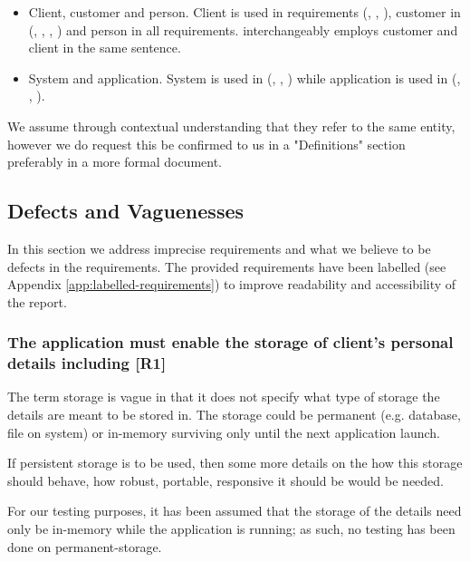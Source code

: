 \begin{itemize} 
	\item Client, customer and person. Client is used in requirements (\ROne, \RTwo, \RFive), customer in (\RTwo, \RThree, \RFour, \RFive) and person in all \REight \space requirements. \RFive \space interchangeably employs customer and client in the same sentence. 
	\item System and application. System is used in (\RTwo, \RSix, \RSeven) while application is used in (\ROne, \RFour, \RFive).
\end{itemize}

We assume through contextual understanding that they refer to the same entity, however we do request this be confirmed to us in a "Definitions" section preferably in a more formal document.
\par


\subsection{Defects and Vaguenesses}

In this section we address imprecise requirements and what we believe to be defects in the requirements. The provided requirements have been labelled (see Appendix \ref{app:labelled-requirements}) to improve readability and accessibility of the report. 

\subsubsection{The application must enable the storage of client’s personal details including [R1]}
The term storage is vague in that it does not specify what type of storage the details are meant to be stored in. The storage could be permanent (e.g. database, file on system) or in-memory surviving only until the next application launch. 
\par
If persistent storage is to be used, then some more details on the how this storage should behave, how robust, portable, responsive it should be would be needed. 
\par
For our testing purposes, it has been assumed that the storage of the details need only be in-memory while the application is running; as such, no testing has been done on permanent-storage.

